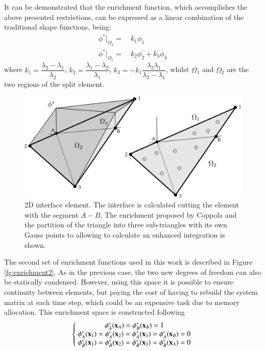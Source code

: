It can be demonstrated\cite{Coppola05} that the enrichment function, which accomplishes the above presented restrictions, can be expressed as a linear combination of the traditional shape functions, being:
 \begin{align}
    \phi^*|_{\Omega_2} = & \ k_1 \phi_1 \label{phi_enrichment-2}\\
    \phi^*|_{\Omega_1} = & \ k_2 \phi_2 + k_3 \phi_3 \label{phi_enrichment-1}
  \end{align}
where $k_1 = \dfrac{\lambda_2-\lambda_1}{\lambda_2}$, $k_2 = \dfrac{\lambda_1-\lambda_2}{\lambda_1}$, $k_3 = -k_1\dfrac{\lambda_3\lambda_1}{\lambda_3-\lambda_1}$, whilst $\Omega_1$ and $\Omega_2$ are the two regions of the split element.

\begin{figure}[H]
  \centering
  \includegraphics[width=.9\columnwidth]{images/enrichment1.pdf}
   \caption{2D interface element. The interface is calculated cutting the element with the segment $A-B$. The enrichment proposed by Coppola and the partition of the triangle into three sub-triangles with its own Gauss points to allowing to calculate an enhanced integration is shown.}
   \label{fg:enrichment1}                %
\end{figure}

The second set of enrichment functions used in this work is described in Figure \ref{fg:enrichment2}. As in the previous case, the two new degrees of freedom can also be statically condensed. However, using this space it is possible to ensure continuity between elements, but paying the cost of having to rebuild the system matrix at each time step, which could be an expensive task due to memory allocation.
This enrichment space is constructed following
\begin{equation}
   \left\{\;
   \begin{matrix}
     \phi_A^*(\mathbf{x}_A)=\phi_B^*(\mathbf{x}_B)=1 \\
     \phi_A^*(\mathbf{x}_1)=\phi_A^*(\mathbf{x}_2)=\phi_A^*(\mathbf{x}_3)=\phi_A^*(\mathbf{x}_B)=0 \\
     \phi_B^*(\mathbf{x}_1)=\phi_B^*(\mathbf{x}_2)=\phi_B^*(\mathbf{x}_3)=\phi_B^*(\mathbf{x}_A)=0
   \end{matrix}\;
   \right.
   \label{eq:enrich-2a}
\end{equation}


